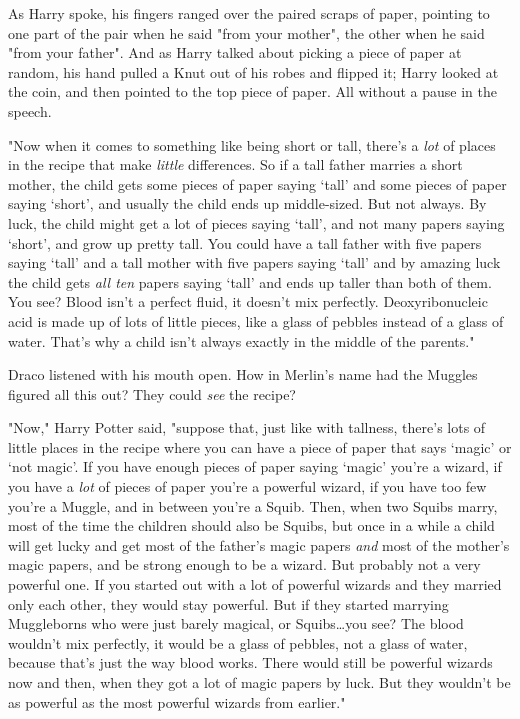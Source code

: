 As Harry spoke, his fingers ranged over the paired scraps of paper, pointing to
one part of the pair when he said "from your mother", the other when he said
"from your father". And as Harry talked about picking a piece of paper at
random, his hand pulled a Knut out of his robes and flipped it; Harry looked at
the coin, and then pointed to the top piece of paper. All without a pause in
the speech.

"Now when it comes to something like being short or tall, there's a \emph{lot}
of places in the recipe that make \emph{little} differences. So if a tall
father marries a short mother, the child gets some pieces of paper saying
`tall' and some pieces of paper saying `short', and usually the child ends up
middle-sized. But not always. By luck, the child might get a lot of pieces
saying `tall', and not many papers saying `short', and grow up pretty tall. You
could have a tall father with five papers saying `tall' and a tall mother with
five papers saying `tall' and by amazing luck the child gets \emph{all ten}
papers saying `tall' and ends up taller than both of them. You see? Blood isn't
a perfect fluid, it doesn't mix perfectly. Deoxyribonucleic acid is made up of
lots of little pieces, like a glass of pebbles instead of a glass of water.
That's why a child isn't always exactly in the middle of the parents."

Draco listened with his mouth open. How in Merlin's name had the Muggles
figured all this out? They could \emph{see} the recipe?

"Now," Harry Potter said, "suppose that, just like with tallness, there's lots
of little places in the recipe where you can have a piece of paper that says
`magic' or `not magic'. If you have enough pieces of paper saying `magic'
you're a wizard, if you have a \emph{lot} of pieces of paper you're a powerful
wizard, if you have too few you're a Muggle, and in between you're a Squib.
Then, when two Squibs marry, most of the time the children should also be
Squibs, but once in a while a child will get lucky and get most of the father's
magic papers \emph{and} most of the mother's magic papers, and be strong enough
to be a wizard. But probably not a very powerful one. If you started out with a
lot of powerful wizards and they married only each other, they would stay
powerful. But if they started marrying Muggleborns who were just barely
magical, or Squibs…you see? The blood wouldn't mix perfectly, it would
be a glass of pebbles, not a glass of water, because that's just the way blood
works. There would still be powerful wizards now and then, when they got a lot
of magic papers by luck. But they wouldn't be as powerful as the most powerful
wizards from earlier."


